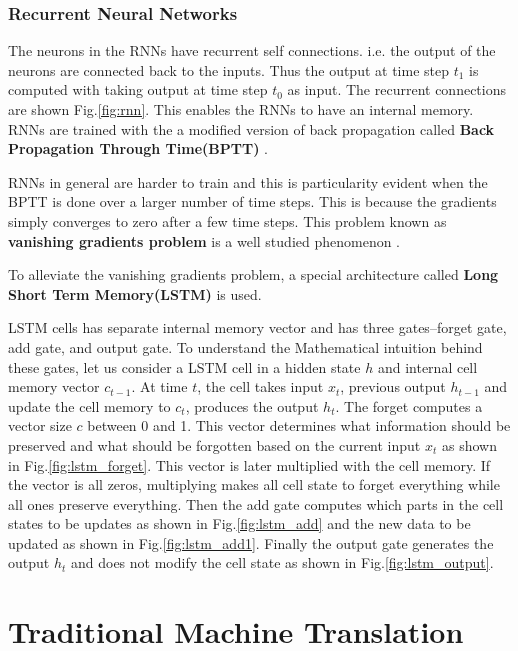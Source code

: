 \documentclass[a4paper]{article}
\begin{document}
\subsubsection{Recurrent Neural Networks}

The neurons in the RNNs have recurrent  self connections. i.e. the output of the
neurons are  connected back to the inputs. Thus the output at time step $t_1$ is
computed  with  taking output  at  time  step  $t_0$  as  input.  The  recurrent
connections  are  shown  Fig.\ref{fig:rnn}.  This  enables the  RNNs to  have an
internal  memory.  RNNs  are  trained  with  the  a  modified  version  of  back
propagation    called    \textbf{Back    Propagation     Through     Time(BPTT)}
\cite{werbos1990backpropagation}.

RNNs in general are harder  to  train and this is particularity evident when the
BPTT is done over a larger number of time steps.  This is because the  gradients
simply converges  to  zero after  a  few  time  steps.  This  problem  known  as
\textbf{vanishing   gradients   problem}    is   a   well   studied   phenomenon
\cite{bengio1994learning}.

To  alleviate  the  vanishing  gradients  problem, a special architecture called
\textbf{Long Short Term Memory(LSTM)} \cite{hochreiter1997long} is used.

LSTM cells has separate internal memory vector and has three gates--forget gate,
add gate, and output gate. To understand the Mathematical intuition behind these
gates, let  us consider a  LSTM cell  in a  hidden state  $h$ and  internal cell
memory vector  $c_{t-1}$.  At  time  $t$,  the cell takes  input $x_t$, previous
output $h_{t-1}$ and update  the  cell memory to  $c_{t}$, produces  the  output
$h_{t}$. The forget  computes  a  vector size $c$  between  0 and 1. This vector
determines what  information should be preserved  and what  should  be forgotten
based  on the  current  input $x_t$ as shown in  Fig.\ref{fig:lstm_forget}. This
vector is later  multiplied with  the cell memory.  If the vector  is all zeros,
multiplying makes  all cell state to forget everything  while all ones  preserve
everything. Then the add gate  computes  which parts  in  the cell states  to be
updates as  shown in Fig.\ref{fig:lstm_add}  and the new  data to be updated  as
shown  in Fig.\ref{fig:lstm_add1}. Finally the output gate generates the  output
$h_t$ and does not modify the cell state as shown in Fig.\ref{fig:lstm_output}.


\section{Traditional Machine Translation}
\end{document}
